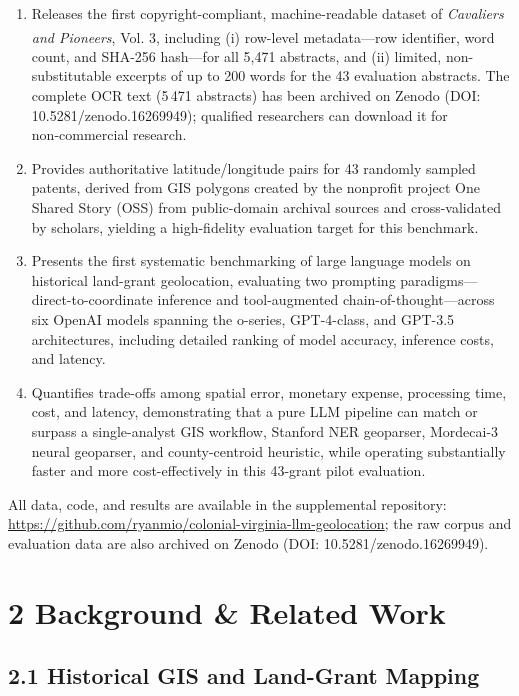 \documentclass[
  10pt,
  twocolumn]{article}
\providecommand{\tightlist}{%
  \setlength{\itemsep}{0pt}\setlength{\parskip}{0pt}}
\begin{document}
\begin{enumerate}
\def\labelenumi{\arabic{enumi}.}
\tightlist
\item
  Releases the first copyright-compliant, machine-readable dataset of
  \emph{Cavaliers and Pioneers}, Vol.
  3\textsuperscript{}, including
  (i) row-level metadata---row identifier, word count, and SHA-256
  hash---for all 5,471 abstracts, and (ii) limited, non-substitutable
  excerpts of up to 200 words for the 43 evaluation abstracts. The
  complete OCR text (5\,471 abstracts) has been archived on Zenodo (DOI:
  10.5281/zenodo.16269949); qualified researchers can download it for
  non‑commercial research.
\item
  Provides authoritative latitude/longitude pairs for 43 randomly
  sampled patents, derived from GIS polygons created by the nonprofit
  project One Shared Story (OSS) from public-domain archival sources and
  cross-validated by scholars, yielding a high-fidelity evaluation
  target for this benchmark.
\item
  Presents the first systematic benchmarking of large language models on
  historical land-grant geolocation, evaluating two prompting
  paradigms---direct-to-coordinate inference and tool-augmented
  chain-of-thought---across six OpenAI models spanning the o-series,
  GPT-4-class, and GPT-3.5 architectures, including detailed ranking of
  model accuracy, inference costs, and latency.
\item
  Quantifies trade-offs among spatial error, monetary expense,
  processing time, cost, and latency, demonstrating that a pure LLM
  pipeline can match or surpass a single-analyst GIS workflow, Stanford
  NER geoparser, Mordecai-3 neural geoparser, and county-centroid
  heuristic, while operating substantially faster and more
  cost-effectively in this 43-grant pilot evaluation.
\end{enumerate}

All data, code, and results are available in the supplemental
repository:
\url{https://github.com/ryanmio/colonial-virginia-llm-geolocation}; the
raw corpus and evaluation data are also archived on Zenodo (DOI:
10.5281/zenodo.16269949).

\section{2 Background \& Related Work}\label{background-related-work}

\subsection{2.1 Historical GIS and Land-Grant
Mapping}\label{historical-gis-and-land-grant-mapping}
\end{document}

